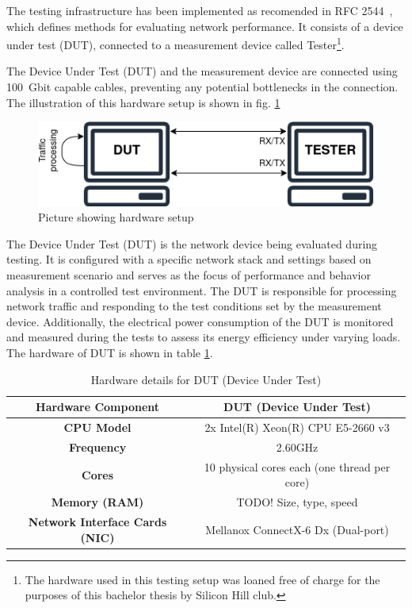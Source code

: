 The testing infrastructure has been implemented as recomended in RFC 2544~\cite{rfc2544}, which defines methods for evaluating network performance. 
It consists of a device under test (DUT), connected to a measurement device called Tester\footnote{The hardware used in this testing setup was loaned free of charge for the purposes of this bachelor thesis by Silicon Hill club.}.

The Device Under Test (DUT) and the measurement device are connected using 100~Gbit capable cables, preventing any potential bottlenecks in the connection.
The illustration of this hardware setup is shown in fig. \ref{fig:hardware-setup}

\begin{figure}[!htbp]
    \centering
    \includegraphics[width=0.9\linewidth]{images/setup.png}
    \caption{Picture showing hardware setup}
    \label{fig:hardware-setup}
\end{figure}

The Device Under Test (DUT) is the network device being evaluated during testing. 
It is configured with a specific network stack and settings based on measurement scenario 
and serves as the focus of performance and behavior analysis in a controlled test environment. 
The DUT is responsible for processing network traffic and responding to the test conditions set by the measurement device.
Additionally, the electrical power consumption of the DUT is monitored and measured during the tests to assess its energy efficiency under varying loads.
The hardware of DUT is shown in table \ref{tab:hardware_dut}.

\begin{table}[h!]
\centering
\caption{Hardware details for DUT (Device Under Test)}
\begin{tabular}{|c|c|}
\hline
\textbf{Hardware Component} & \textbf{DUT (Device Under Test)} \\
\hline
\textbf{CPU Model} & 2x Intel(R) Xeon(R) CPU E5-2660 v3 \\
\hline
\textbf{Frequency} & 2.60GHz \\
\hline
\textbf{Cores} & 10 physical cores each (one thread per core) \\
\hline
\textbf{Memory (RAM)} & TODO! Size, type, speed \\
\hline
\textbf{Network Interface Cards (NIC)} & Mellanox ConnectX-6 Dx (Dual-port) \\
\hline
\end{tabular}
\label{tab:hardware_dut}
\end{table}

